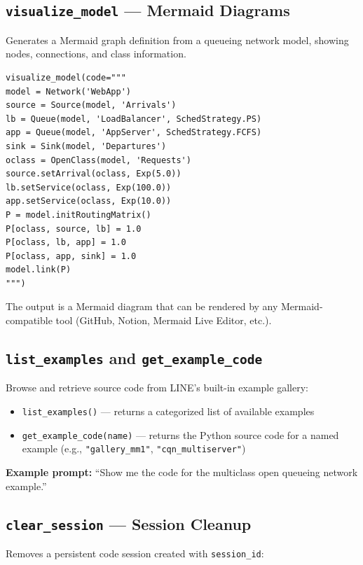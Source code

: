 \documentclass[11pt]{article}
\begin{document}
\subsection{\texttt{visualize\_model} --- Mermaid Diagrams}

Generates a Mermaid graph definition from a queueing network model, showing nodes, connections, and class information.

\begin{lstlisting}[style=pythonstyle]
visualize_model(code="""
model = Network('WebApp')
source = Source(model, 'Arrivals')
lb = Queue(model, 'LoadBalancer', SchedStrategy.PS)
app = Queue(model, 'AppServer', SchedStrategy.FCFS)
sink = Sink(model, 'Departures')
oclass = OpenClass(model, 'Requests')
source.setArrival(oclass, Exp(5.0))
lb.setService(oclass, Exp(100.0))
app.setService(oclass, Exp(10.0))
P = model.initRoutingMatrix()
P[oclass, source, lb] = 1.0
P[oclass, lb, app] = 1.0
P[oclass, app, sink] = 1.0
model.link(P)
""")
\end{lstlisting}

The output is a Mermaid diagram that can be rendered by any Mermaid-compatible tool (GitHub, Notion, Mermaid Live Editor, etc.).

\subsection{\texttt{list\_examples} and \texttt{get\_example\_code}}

Browse and retrieve source code from LINE's built-in example gallery:

\begin{itemize}
    \item \texttt{list\_examples()} --- returns a categorized list of available examples
    \item \texttt{get\_example\_code(name)} --- returns the Python source code for a named example (e.g., \texttt{"gallery\_mm1"}, \texttt{"cqn\_multiserver"})
\end{itemize}

\noindent\textbf{Example prompt:} ``Show me the code for the multiclass open queueing network example.''

\subsection{\texttt{clear\_session} --- Session Cleanup}

Removes a persistent code session created with \texttt{session\_id}:
\end{document}
